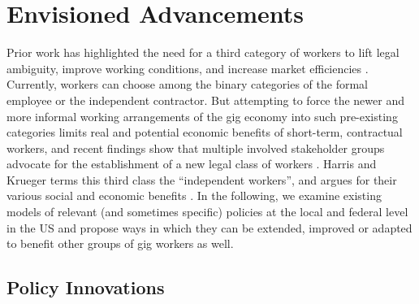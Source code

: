 \section{Envisioned Advancements}
Prior work has highlighted the need for a third category of workers to lift legal ambiguity, improve working conditions, and increase market efficiencies \cite{harris2015proposal}. Currently, workers can choose among the binary categories of the formal employee or the independent contractor. But attempting to force the newer and more informal working arrangements of the gig economy into such pre-existing categories limits real and potential economic benefits of short-term, contractual workers, and recent findings show that multiple involved stakeholder groups advocate for the establishment of a new legal class of workers \cite{codesign}. Harris and Krueger terms this third class the ``independent workers'', and argues for their various social and economic benefits \cite{harris2015proposal}. In the following, we examine existing models of relevant (and sometimes specific) policies at the local and federal level in the US and propose ways in which they can be extended, improved or adapted to benefit other groups of gig workers as well. 

\subsection{Policy Innovations}
